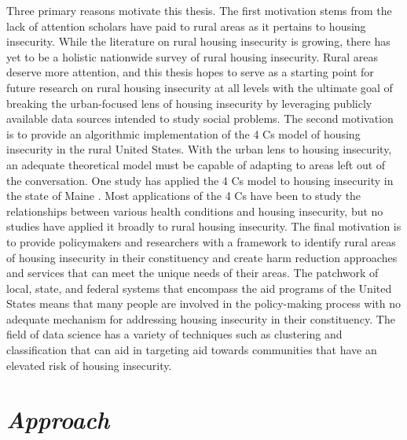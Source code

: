 Three primary reasons motivate this thesis. The first motivation stems from the lack of attention scholars have paid to rural areas as it pertains to housing insecurity. While the literature on rural housing insecurity is growing, there has yet to be a holistic nationwide survey of rural housing insecurity. Rural areas deserve more attention, and this thesis hopes to serve as a starting point for future research on rural housing insecurity at all levels with the ultimate goal of breaking the urban-focused lens of housing insecurity by leveraging publicly available data sources intended to study social problems. The second motivation is to provide an algorithmic implementation of the 4 Cs model of housing insecurity in the rural United States. With the urban lens to housing insecurity, an adequate theoretical model must be capable of adapting to areas left out of the conversation. One study has applied the 4 Cs model to housing insecurity in the state of Maine \citep{gleason_using_2021}. Most applications of the 4 Cs have been to study the relationships between various health conditions and housing insecurity, but no studies have applied it broadly to rural housing insecurity. The final motivation is to provide policymakers and researchers with a framework to identify rural areas of housing insecurity in their constituency and create harm reduction approaches and services that can meet the unique needs of their areas. The patchwork of local, state, and federal systems that encompass the aid programs of the United States means that many people are involved in the policy-making process with no adequate mechanism for addressing housing insecurity in their constituency. The field of data science has a variety of techniques such as clustering and classification that can aid in targeting aid towards communities that have an elevated risk of housing insecurity.

 

\section{\textit{Approach}} 

